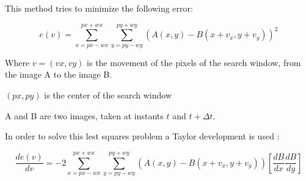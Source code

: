 This method tries to minimize the following error:

$$e(v)= \sum\limits_{x=px-wx}^{px+wx} \sum\limits_{y=py-wy}^{py+wy} (A(x,y) - B(x+v_x,y+v_y))^2$$

Where $v=(vx,vy)$ is the movement of the pixels of the search window, from the image A to the image B.

$(px,py)$ is the center of the search window

A and B are two images, taken at instants $t$ and $t+\Delta t$.


In order to solve this lest squares problem a Taylor development is used :

$$\frac{de(v)}{dv} = -2 \sum\limits_{x=px-wx}^{px+wx} \sum\limits_{y=py-wy}^{py+wy} (A(x,y) - B(x+v_x,y+v_y)) [\frac{dB}{dx} \frac{dB}{dy}]$$


